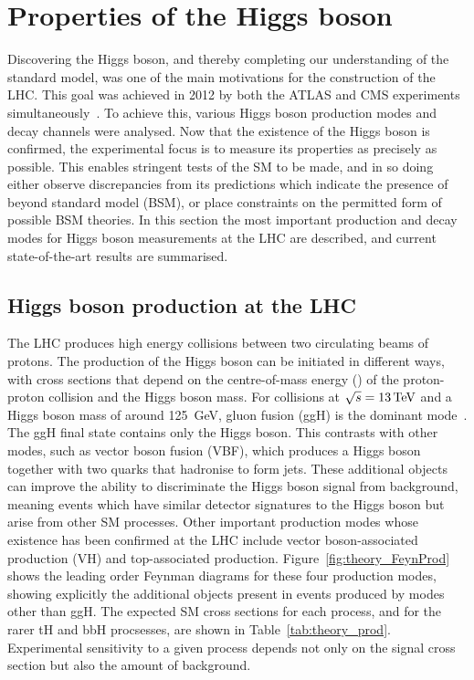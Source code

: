 \section{Properties of the Higgs boson}

Discovering the Higgs boson, and thereby completing our understanding of the standard model, 
was one of the main motivations for the construction of the LHC. %
This goal was achieved in 2012 
by both the ATLAS and CMS experiments simultaneously~\cite{ATLASdiscovery,CMSdiscovery}.
To achieve this, various Higgs boson production modes and decay channels were analysed.
Now that the existence of the Higgs boson is confirmed, 
the experimental focus is to measure its properties as precisely as possible.
This enables stringent tests of the SM to be made, 
and in so doing either observe discrepancies from its predictions
which indicate the presence of beyond standard model (BSM), 
or place constraints on the permitted form of possible BSM theories.
In this section the most important production and decay modes for Higgs boson measurements
at the LHC are described, and current state-of-the-art results are summarised.

\subsection{Higgs boson production at the LHC}

The LHC produces high energy collisions between two circulating beams of protons.
The production of the Higgs boson can be initiated in different ways, 
with cross sections that depend on the centre-of-mass energy (\sqrtS) of the proton-proton collision
and the Higgs boson mass.
For collisions at $\sqrt{s}=\SI{13}{TeV}$ and a Higgs boson mass of around \SI{125}{GeV}, 
gluon fusion (ggH) is the dominant mode~\cite{YR4}.
The ggH final state contains only the Higgs boson. 
This contrasts with other modes, such as vector boson fusion (VBF), 
which produces a Higgs boson together with two quarks that hadronise to form jets.
These additional objects can improve the ability to discriminate the Higgs boson signal 
from background, meaning events which have similar detector signatures to the Higgs boson
but arise from other SM processes.
Other important production modes whose existence has been confirmed at the LHC include 
vector boson-associated production (VH) and top-associated production.
Figure~\ref{fig:theory_FeynProd} shows the leading order Feynman diagrams 
for these four production modes, showing explicitly the additional objects present 
in events produced by modes other than ggH.
The expected SM cross sections for each process, and for the rarer tH and bbH procsesses, 
are shown in Table~\ref{tab:theory_prod}.
Experimental sensitivity to a given process depends not only on the signal cross section 
but also the amount of background.

